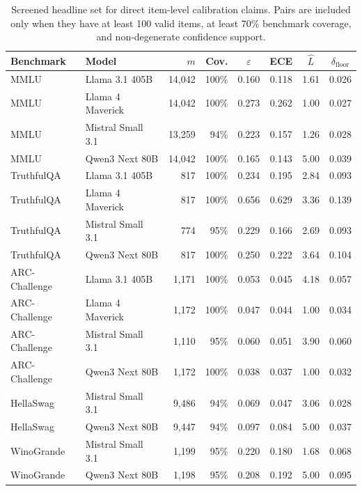 \begin{table}[t]
\centering
\caption{Screened headline set for direct item-level calibration claims. Pairs are included only when they have at least 100 valid items, at least 70\% benchmark coverage, and non-degenerate confidence support.}
\label{tab:screened-roster}
\small
\begin{tabular}{llrrcccc}
\toprule
Benchmark & Model & $m$ & Cov. & $\varepsilon$ & ECE & $\hat{L}$ & $\delta_{\mathrm{floor}}$ \\
\midrule
MMLU & Llama 3.1 405B & 14,042 & 100\% & 0.160 & 0.118 & 1.61 & 0.026 \\
MMLU & Llama 4 Maverick & 14,042 & 100\% & 0.273 & 0.262 & 1.00 & 0.027 \\
MMLU & Mistral Small 3.1 & 13,259 & 94\% & 0.223 & 0.157 & 1.26 & 0.028 \\
MMLU & Qwen3 Next 80B & 14,042 & 100\% & 0.165 & 0.143 & 5.00 & 0.039 \\
\midrule
TruthfulQA & Llama 3.1 405B & 817 & 100\% & 0.234 & 0.195 & 2.84 & 0.093 \\
TruthfulQA & Llama 4 Maverick & 817 & 100\% & 0.656 & 0.629 & 3.36 & 0.139 \\
TruthfulQA & Mistral Small 3.1 & 774 & 95\% & 0.229 & 0.166 & 2.69 & 0.093 \\
TruthfulQA & Qwen3 Next 80B & 817 & 100\% & 0.250 & 0.222 & 3.64 & 0.104 \\
\midrule
ARC-Challenge & Llama 3.1 405B & 1,171 & 100\% & 0.053 & 0.045 & 4.18 & 0.057 \\
ARC-Challenge & Llama 4 Maverick & 1,172 & 100\% & 0.047 & 0.044 & 1.00 & 0.034 \\
ARC-Challenge & Mistral Small 3.1 & 1,110 & 95\% & 0.060 & 0.051 & 3.90 & 0.060 \\
ARC-Challenge & Qwen3 Next 80B & 1,172 & 100\% & 0.038 & 0.037 & 1.00 & 0.032 \\
\midrule
HellaSwag & Mistral Small 3.1 & 9,486 & 94\% & 0.069 & 0.047 & 3.06 & 0.028 \\
HellaSwag & Qwen3 Next 80B & 9,447 & 94\% & 0.097 & 0.084 & 5.00 & 0.037 \\
\midrule
WinoGrande & Mistral Small 3.1 & 1,199 & 95\% & 0.220 & 0.180 & 1.68 & 0.068 \\
WinoGrande & Qwen3 Next 80B & 1,198 & 95\% & 0.208 & 0.192 & 5.00 & 0.095 \\
\bottomrule
\end{tabular}
\end{table}